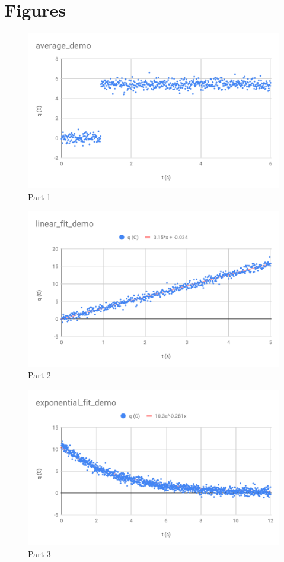 \section{Figures}
%
\begin{figure}[ht]
    \includegraphics[scale=0.98]{image/00-review/average_demo.pdf}
    \caption{Part 1}
    \label{figure_00_average}
\end{figure}
%
\begin{figure}[ht]
    \includegraphics[scale=0.98]{image/00-review/linear_fit_demo.pdf}
    \caption{Part 2}
    \label{figure_00_linear}
\end{figure}
%
\begin{figure}[ht]
    \includegraphics[scale=0.98]{image/00-review/exponential_fit_demo.pdf}
    \caption{Part 3}
    \label{figure_00_exponential}
\end{figure}
%